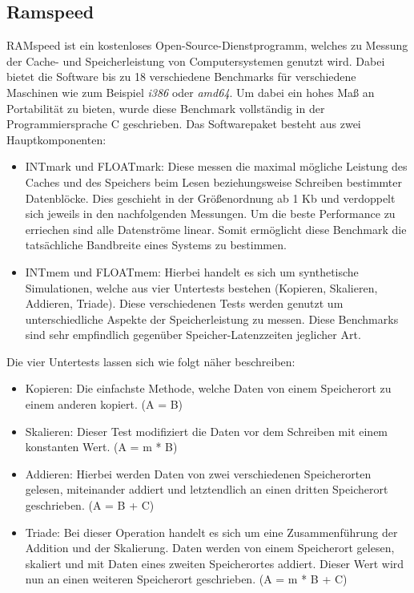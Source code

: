 \subsection{Ramspeed}\label{kap:ramspeed}
RAMspeed ist ein kostenloses Open-Source-Dienstprogramm, welches zu Messung der Cache- und Speicherleistung von Computersystemen genutzt wird. Dabei bietet die Software bis zu 18 verschiedene
Benchmarks für verschiedene Maschinen wie zum Beispiel \emph{i386} oder \emph{amd64}. Um dabei ein hohes Maß an Portabilität zu bieten, wurde diese Benchmark vollständig in der Programmiersprache
C geschrieben. Das Softwarepaket besteht aus zwei Hauptkomponenten:~\cite{ramspeed}\\
\begin{itemize}
  \item INTmark und FLOATmark: Diese messen die maximal mögliche Leistung des Caches und des Speichers beim Lesen beziehungsweise Schreiben bestimmter Datenblöcke. Dies geschieht in der Größenordnung ab 1 Kb und
                               verdoppelt sich jeweils in den nachfolgenden Messungen. Um die beste Performance zu erriechen sind alle Datenströme linear. Somit ermöglicht diese Benchmark die
                               tatsächliche Bandbreite eines Systems zu bestimmen.
  \item INTmem und FLOATmem: Hierbei handelt es sich um synthetische Simulationen, welche aus vier Untertests bestehen (Kopieren, Skalieren, Addieren, Triade). Diese verschiedenen Tests werden
                             genutzt um unterschiedliche Aspekte der Speicherleistung zu messen. Diese Benchmarks sind sehr empfindlich gegenüber Speicher-Latenzzeiten jeglicher Art.
\end{itemize}

Die vier Untertests lassen sich wie folgt näher beschreiben:\\
\begin{itemize}
  \item Kopieren: Die einfachste Methode, welche Daten von einem Speicherort zu einem anderen kopiert. (A = B)
  \item Skalieren: Dieser Test modifiziert die Daten vor dem Schreiben mit einem konstanten Wert. (A = m * B)
  \item Addieren: Hierbei werden Daten von zwei verschiedenen Speicherorten gelesen, miteinander addiert und letztendlich an einen dritten Speicherort geschrieben. (A = B + C)
  \item Triade: Bei dieser Operation handelt es sich um eine Zusammenführung der Addition und der Skalierung. Daten werden von einem Speicherort gelesen, skaliert und mit Daten eines zweiten Speicherortes
                addiert. Dieser Wert wird nun an einen weiteren Speicherort geschrieben. (A = m * B + C)
\end{itemize}

